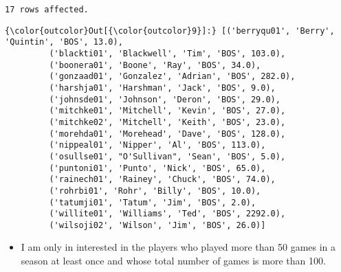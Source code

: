 \documentclass[11pt]{article}
\providecommand{\tightlist}{%
      \setlength{\itemsep}{0pt}\setlength{\parskip}{0pt}}
\begin{document}
    \begin{Verbatim}[commandchars=\\\{\}]
17 rows affected.

    \end{Verbatim}

\begin{Verbatim}[commandchars=\\\{\}]
{\color{outcolor}Out[{\color{outcolor}9}]:} [('berryqu01', 'Berry', 'Quintin', 'BOS', 13.0),
         ('blackti01', 'Blackwell', 'Tim', 'BOS', 103.0),
         ('boonera01', 'Boone', 'Ray', 'BOS', 34.0),
         ('gonzaad01', 'Gonzalez', 'Adrian', 'BOS', 282.0),
         ('harshja01', 'Harshman', 'Jack', 'BOS', 9.0),
         ('johnsde01', 'Johnson', 'Deron', 'BOS', 29.0),
         ('mitchke01', 'Mitchell', 'Kevin', 'BOS', 27.0),
         ('mitchke02', 'Mitchell', 'Keith', 'BOS', 23.0),
         ('morehda01', 'Morehead', 'Dave', 'BOS', 128.0),
         ('nippeal01', 'Nipper', 'Al', 'BOS', 113.0),
         ('osullse01', "O'Sullivan", 'Sean', 'BOS', 5.0),
         ('puntoni01', 'Punto', 'Nick', 'BOS', 65.0),
         ('rainech01', 'Rainey', 'Chuck', 'BOS', 74.0),
         ('rohrbi01', 'Rohr', 'Billy', 'BOS', 10.0),
         ('tatumji01', 'Tatum', 'Jim', 'BOS', 2.0),
         ('willite01', 'Williams', 'Ted', 'BOS', 2292.0),
         ('wilsoji02', 'Wilson', 'Jim', 'BOS', 26.0)]
\end{Verbatim}
            
    \begin{itemize}
\tightlist
\item
  I am only in interested in the players who played more than 50 games
  in a season at least once and whose total number of games is more than
  100.
\end{itemize}
\end{document}

